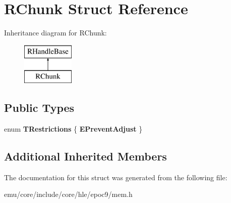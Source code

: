 \hypertarget{struct_r_chunk}{}\section{R\+Chunk Struct Reference}
\label{struct_r_chunk}
Inheritance diagram for R\+Chunk\+:\begin{figure}[H]
\begin{center}
\leavevmode
\includegraphics[height=2.000000cm]{struct_r_chunk}
\end{center}
\end{figure}
\subsection*{Public Types}
\begin{DoxyCompactItemize}
\item 
\mbox{\label{struct_r_chunk_a311cd921498eed997a676a51034b9fbf}} 
enum {\bfseries T\+Restrictions} \{ {\bfseries E\+Prevent\+Adjust}
 \}
\end{DoxyCompactItemize}
\subsection*{Additional Inherited Members}


The documentation for this struct was generated from the following file\+:\begin{DoxyCompactItemize}
\item 
emu/core/include/core/hle/epoc9/mem.\+h\end{DoxyCompactItemize}
